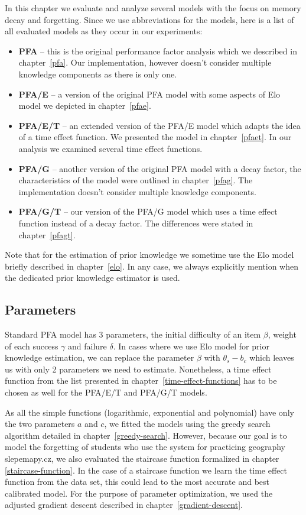 In this chapter we evaluate and analyze several models with the focus on memory decay and forgetting. Since we use abbreviations for the models, here is a list of all evaluated models as they occur in our experiments:

\begin{itemize}
  \item \textbf{PFA} -- this is the original performance factor analysis which we described in chapter~\ref{pfa}. Our implementation, however doesn't consider multiple knowledge components as there is only one.
  \item \textbf{PFA/E} -- a version of the original PFA model with some aspects of Elo model we depicted in chapter~\ref{pfae}.
  \item \textbf{PFA/E/T} -- an extended version of the PFA/E model which adapts the idea of a time effect function. We presented the model in chapter~\ref{pfaet}. In our analysis we examined several time effect functions.
  \item \textbf{PFA/G} -- another version of the original PFA model with a decay factor, the characteristics of the model were outlined in chapter~\ref{pfag}. The implementation doesn't consider multiple knowledge components.
  \item \textbf{PFA/G/T} -- our version of the PFA/G model which uses a time effect function instead of a decay factor. The differences were stated in chapter~\ref{pfagt}.
\end{itemize}

Note that for the estimation of prior knowledge we sometime use the Elo model briefly described in chapter~\ref{elo}. In any case, we always explicitly mention when the dedicated prior knowledge estimator is used.

\subsection{Parameters}

Standard PFA model has 3 parameters, the initial difficulty of an item $\beta$, weight of each success $\gamma$ and failure $\delta$. In cases where we use Elo model for prior knowledge estimation, we can replace the parameter $\beta$ with $\theta_s - b_c$ which leaves us with only 2 parameters we need to estimate. Nonetheless, a time effect function from the list presented in chapter~\ref{time-effect-functions} has to be chosen as well for the PFA/E/T and PFA/G/T models.

As all the simple functions (logarithmic, exponential and polynomial) have only the two parameters $a$ and $c$, we fitted the models using the greedy search algorithm detailed in chapter~\ref{greedy-search}. However, because our goal is to model the forgetting of students who use the system for practicing geography slepemapy.cz, we also evaluated the staircase function formalized in chapter \ref{staircase-function}. In the case of a staircase function we learn the time effect function from the data set, this could lead to the most accurate and best calibrated model. For the purpose of parameter optimization, we used the adjusted gradient descent described in chapter~\ref{gradient-descent}.

